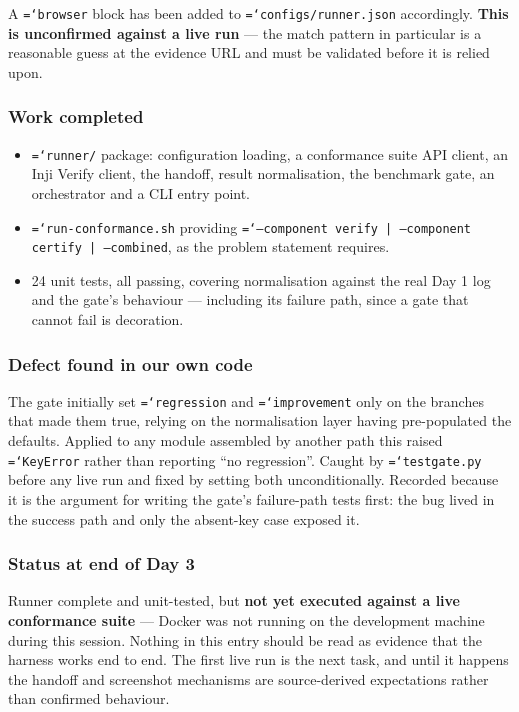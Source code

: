 \documentclass[11pt,a4paper]{article}
\newcommand{\tightlist}{\setlength{\itemsep}{0pt}\setlength{\parskip}{0pt}\setlength{\parsep}{0pt}}
\let\origtexttt\texttt
\renewcommand{\texttt}[1]{\origtexttt{\hyphenchar\font=`\-\relax #1}}
\renewcommand{\_}{\textunderscore\allowbreak}
\begin{document}
A \texttt{browser} block has been added to \texttt{configs/runner.json} accordingly.
\textbf{This is unconfirmed against a live run} --- the match pattern in particular is a
reasonable guess at the evidence URL and must be validated before it is relied upon.

\subsubsection*{Work completed}
\begin{itemize}\tightlist
  \item \texttt{runner/} package: configuration loading, a conformance suite API client, an
        Inji Verify client, the handoff, result normalisation, the benchmark gate, an
        orchestrator and a CLI entry point.
  \item \texttt{run-conformance.sh} providing \texttt{--component verify | --component
        certify | --combined}, as the problem statement requires.
  \item 24 unit tests, all passing, covering normalisation against the real Day 1 log and
        the gate's behaviour --- including its failure path, since a gate that cannot fail
        is decoration.
\end{itemize}

\subsubsection*{Defect found in our own code}
The gate initially set \texttt{regression} and \texttt{improvement} only on the branches
that made them true, relying on the normalisation layer having pre-populated the defaults.
Applied to any module assembled by another path this raised \texttt{KeyError} rather than
reporting ``no regression''. Caught by \texttt{test\_gate.py} before any live run and fixed
by setting both unconditionally. Recorded because it is the argument for writing the gate's
failure-path tests first: the bug lived in the success path and only the absent-key case
exposed it.

\subsubsection*{Status at end of Day 3}
Runner complete and unit-tested, but \textbf{not yet executed against a live conformance
suite} --- Docker was not running on the development machine during this session. Nothing in
this entry should be read as evidence that the harness works end to end. The first live run
is the next task, and until it happens the handoff and screenshot mechanisms are
source-derived expectations rather than confirmed behaviour.
\end{document}
